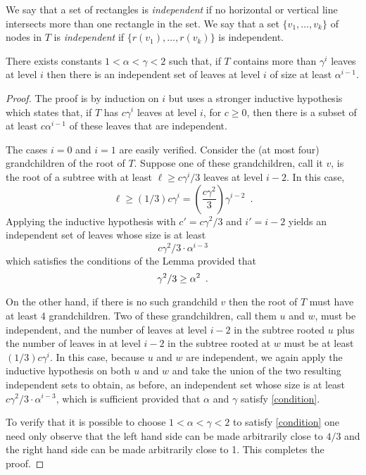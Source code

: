 \documentclass[lotsofwhite,charterfonts]{patmorin}
\begin{document}
We say that a set of rectangles is \emph{independent} if no horizontal
or vertical line intersects more than one rectangle in the set.  We
say that a set $\{v_1,\ldots,v_k\}$ of nodes in $T$ is
\emph{independent} if $\{r(v_1),\ldots,r(v_k)\}$ is independent.

\begin{lem}
There exists constants $1 < \alpha < \gamma < 2$ such that,
if $T$ contains more than $\gamma^i$ leaves at level $i$ then there is
an independent set of leaves at level $i$ of size at least
$\alpha^{i-1}$.
\end{lem}

\begin{proof}
The proof is by induction on $i$ but uses a stronger inductive
hypothesis which states that, if $T$ has $c\gamma^i$ leaves at
level $i$, for $c\ge 0$, then there is a subset of at least
$c\alpha^{i-1}$ of these leaves that are independent.  

The cases $i=0$ and $i=1$ are easily verified.
Consider the (at most four) grandchildren of the root of $T$.
Suppose one of these grandchildren, call it $v$, is the root of a
subtree with at least $\ell \ge c\gamma^i/3$ leaves at level $i-2$.
In this case,
\[
    \ell \ge (1/3) c\gamma^i = \left(\frac{c\gamma^2}{3}\right)
		\gamma^{i-2} \enspace .
\]
Applying the inductive hypothesis with $c'=c\gamma^2/3$ and $i'=i-2$
yields an independent set of leaves whose size is at least
\[
     c\gamma^2/3\cdot\alpha^{i-3}
\] 
which satisfies the conditions of the Lemma provided that
\begin{equation}
	\gamma^2/3 \ge \alpha^2 \enspace . \eqlabel{condition}
\end{equation}

On the other hand, if there is no such grandchild $v$ then the root of
$T$ must have at least 4 grandchildren.  Two of these grandchildren,
call them $u$ and $w$, must be independent, and the number of leaves
at level $i-2$ in the subtree rooted $u$ plus the number of leaves in
at level $i-2$ in the subtree rooted at $w$ must be at least $(1/3)
c\gamma^i$.  In this case, because $u$ and $w$ are independent, we
again apply the inductive hypothesis on both $u$ and $w$ and take the
union of the two resulting independent sets to obtain, as before, an
independent set whose size is at least $c\gamma^2/3\cdot\alpha^{i-3}$,
which is sufficient provided that $\alpha$ and $\gamma$ satisfy
\eqref{condition}.

To verify that it is possible to choose $1 < \alpha <\gamma < 2$ to
satisfy \eqref{condition} one need only observe that the left hand
side can be made arbitrarily close to $4/3$ and the right hand side
can be made arbitrarily close to 1.  This completes the proof.
\end{proof}
\end{document}
